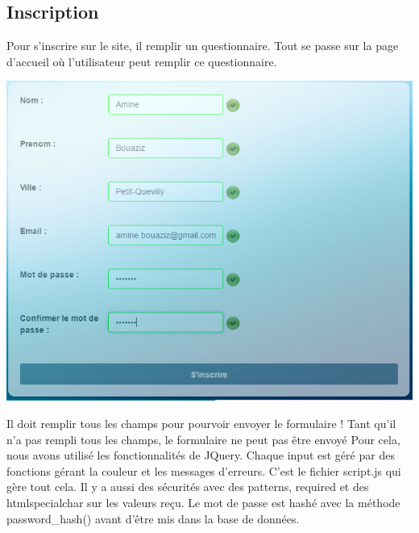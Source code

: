 \documentclass[hidelinks, 12pt,a4paper]{article}
\begin{document}
\subsection{Inscription}
Pour s'inscrire sur le site, il remplir un questionnaire. Tout se passe sur la page d'accueil où l'utilisateur peut remplir ce questionnaire. \\

\begin{center}
\includegraphics[scale=0.8]{images/inscriptionvalid.png} 
\end{center}

Il doit remplir tous les champs pour pourvoir envoyer le formulaire ! Tant qu'il n'a pas rempli tous les champs, le formulaire ne peut pas être envoyé Pour cela, nous avons utilisé les fonctionnalités de JQuery. Chaque input est géré par des fonctions gérant la couleur et les messages d'erreurs. C’est le fichier script.js qui gère tout cela. Il y a aussi des sécurités avec des patterns, required et des htmlspecialchar sur les valeurs reçu.
Le mot de passe est hashé avec la méthode password\_hash() avant d'être mis dans la base de données.\\
\end{document}
